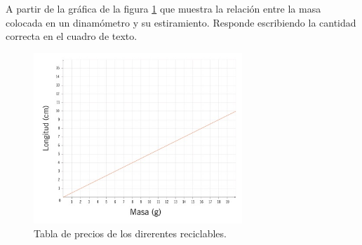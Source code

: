 A partir de la gráfica de la figura \ref{fig:SINMAT1_U3_AC75_IMG1} que muestra la relación entre la masa colocada en un dinamómetro y su estiramiento. Responde escribiendo la cantidad correcta en el cuadro de texto.
\begin{figure}[H]
    \centering
    \includegraphics[width=0.7\textwidth]{../images/SINMAT1_U3_AC75_IMG1.jpg}
    \caption{Tabla de precios de los direrentes reciclables.}
    \label{fig:SINMAT1_U3_AC75_IMG1}
\end{figure}
\begin{parts}
    
    
    
    
    

\end{parts}
